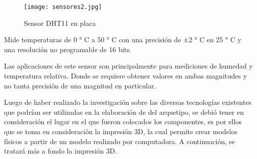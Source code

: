\begin{itemize}
	\begin{figure}[H]
		\centering
		\texttt{[image: sensores2.jpg]}
		\caption{Sensor DHT11 en placa}
	\end{figure}
	
	\par \noindent
	Mide temperaturas de 0 ° C a 50 ° C con una precisión de ±2 ° C en 25 ° C y una resolución no programable de 16 bits.
	
	\par \noindent
	Las aplicaciones de este sensor son principalmente para mediciones de humedad y temperatura relativa. Donde se requiere obtener valores en ambas magnitudes y no tanta precisión de una magnitud en particular\cite{dht11}. 
	
\end{itemize}

\par \noindent
Luego de haber realizado la investigación sobre las diversas tecnologías existentes que podrían ser utilizadas en la elaboración de del arquetipo, se debió tener en consideración el lugar en el que fueron colocados los componentes, es por ellos que se toma en consideración la impresión 3D, la cual permite crear modelos físicos a partir de un modelo realizado por computadora. A continuación, se tratará más a fondo la impresión 3D.

